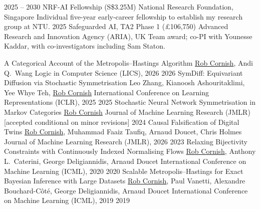 \documentclass[9pt]{developercv}
\begin{document}
\vspace{-2.5em}

\begin{entrylist}
    \entry
    {2025 -- 2030}
    {NRF-AI Fellowship (S\$3.25M)}
    {National Research Foundation, Singapore}
    {Individual five-year early-career fellowship to establish my research group at NTU.}
    \entry
    {2025}
    {Safeguarded AI, TA2 Phase 1 (\pounds106,750)}
    {Advanced Research and Innovation Agency (ARIA), UK}
    {Team award; co-PI with Younesse Kaddar, with co-investigators including Sam Staton.}
\end{entrylist}

\vspace{-1.5em}

\begin{entrylist}
    \publication
        {A Categorical Account of the Metropolis--Hastings Algorithm}
        {\underline{Rob Cornish}, Andi Q.\ Wang}
        {Logic in Computer Science (LICS), 2026}
        {2026}
    \publication
        {SymDiff: Equivariant Diffusion via Stochastic Symmetrisation}
        {Leo Zhang, Kianoosh Ashouritaklimi, Yee Whye Teh, \underline{Rob Cornish}}
        {International Conference on Learning Representations (ICLR), 2025}
        {2025}
    \publication
        {Stochastic Neural Network Symmetrisation in Markov Categories}
        {\underline{Rob Cornish}}
        {Journal of Machine Learning Research (JMLR) [accepted conditional on minor revisions]}
        {2024}
    \publication
        {Causal Falsification of Digital Twins}
        {\underline{Rob Cornish}, Muhammad Faaiz Taufiq, Arnaud Doucet, Chris Holmes}
        {Journal of Machine Learning Research (JMLR), 2026}
        {2023}
    \publication
        {Relaxing Bijectivity Constraints with Continuously Indexed Normalising Flows}
        {\underline{Rob Cornish}, Anthony L.\ Caterini, George Deligiannidis, Arnaud Doucet}
        {International Conference on Machine Learning (ICML), 2020}
        {2020}
    \publication
        {Scalable Metropolis--Hastings for Exact Bayesian Inference with Large Datasets}
        {\underline{Rob Cornish}, Paul Vanetti, Alexandre Bouchard-C\^ot\'e, George Deligiannidis, Arnaud Doucet}
        {International Conference on Machine Learning (ICML), 2019}
        {2019}
\end{entrylist}

\vspace{-2em}
\end{document}
